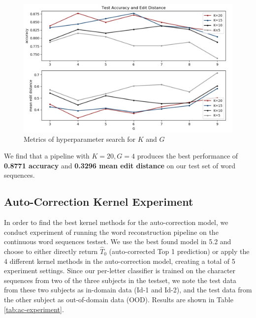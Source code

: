 \documentclass{article}
\begin{document}
\begin{multicols*}{2}
\begin{figure}[H]
    \centering
    \includegraphics[scale=0.2]{gk_metric.png}
    \caption{Metrics of hyperparameter search for $K$ and $G$}
\end{figure}
\vspace{-10px}


We find that a pipeline with $K=20, G=4$ produces the best performance of \textbf{0.8771 accuracy} and \textbf{0.3296 mean edit distance} on our test set of word sequences.


\subsection{Auto-Correction Kernel Experiment}

In order to find the best kernel methods for the auto-correction model, we conduct experiment of running the word reconstruction pipeline on the continuous word sequences testset. We use the best found model in 5.2 and choose to either directly return $\hat{T}_0$ (auto-corrected Top 1 prediction) or apply the 4 different kernel methods in the auto-correction model, creating a total of 5 experiment settings. Since our per-letter classifier is trained on the character sequences from two of the three subjects in the testset, we note the test data from these two subjects as in-domain data (Id-1 and Id-2), and the test data from the other subject as out-of-domain data (OOD). Results are shown in Table \ref{tab:ac-experiment}.  


\end{multicols*}
\end{document}
